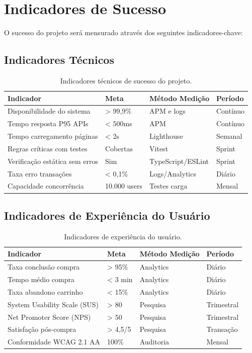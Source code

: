 \section{Indicadores de Sucesso}

O sucesso do projeto será mensurado através dos seguintes indicadores-chave:

\subsection{Indicadores Técnicos}

\begin{table}[H]
\centering
\caption{Indicadores técnicos de sucesso do projeto.}%
\label{tab:kpi-tecnicos}
\small
\begin{tabular}{|p{5cm}|p{2.5cm}|p{3cm}|p{2cm}|}
\hline
\textbf{Indicador} & \textbf{Meta} & \textbf{Método Medição} & \textbf{Período} \\ \hline
Disponibilidade do sistema & > 99,9\% & APM e logs & Contínuo \\ \hline
Tempo resposta P95 APIs & < 500ms & APM & Contínuo \\ \hline
Tempo carregamento páginas & < 2s & Lighthouse & Semanal \\ \hline
Regras críticas com testes & Cobertas & Vitest & Sprint \\ \hline
Verificação estática sem erros & Sim & TypeScript/ESLint & Sprint \\ \hline
Taxa erro transações & < 0,1\% & Logs/Analytics & Diário \\ \hline
Capacidade concorrência & 10.000 users & Testes carga & Mensal \\ \hline
\end{tabular}
\end{table}

\subsection{Indicadores de Experiência do Usuário}

\begin{table}[H]
\centering
\caption{Indicadores de experiência do usuário.}%
\label{tab:kpi-ux}
\small
\begin{tabular}{|p{5cm}|p{2.5cm}|p{3cm}|p{2cm}|}
\hline
\textbf{Indicador} & \textbf{Meta} & \textbf{Método Medição} & \textbf{Período} \\ \hline
Taxa conclusão compra & > 95\% & Analytics & Diário \\ \hline
Tempo médio compra & < 3 min & Analytics & Diário \\ \hline
Taxa abandono carrinho & < 15\% & Analytics & Diário \\ \hline
System Usability Scale (SUS) & > 80 & Pesquisa & Trimestral \\ \hline
Net Promoter Score (NPS) & > 50 & Pesquisa & Trimestral \\ \hline
Satisfação pós-compra & > 4,5/5 & Pesquisa & Transação \\ \hline
Conformidade WCAG 2.1 AA & 100\% & Auditoria & Mensal \\ \hline
\end{tabular}
\end{table}

